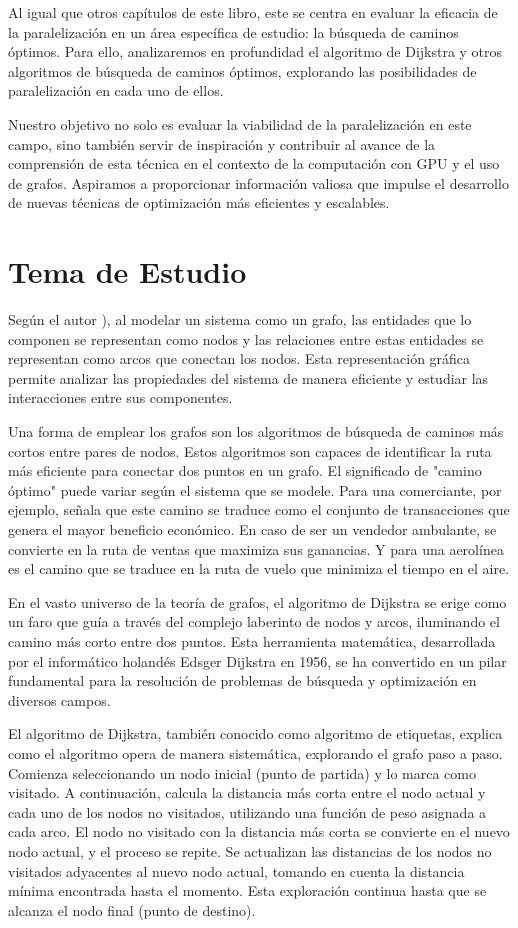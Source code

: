 Al igual que otros capítulos de este libro, este se centra en evaluar la eficacia de la paralelización en un área específica de estudio: la búsqueda de caminos óptimos. Para ello, analizaremos en profundidad el algoritmo de Dijkstra y otros algoritmos de búsqueda de caminos óptimos, explorando las posibilidades de paralelización en cada uno de ellos.

Nuestro objetivo no solo es evaluar la viabilidad de la paralelización en este campo, sino también servir de inspiración y contribuir al avance de la comprensión de esta técnica en el contexto de la computación con GPU y el uso de grafos. Aspiramos a proporcionar información valiosa que impulse el desarrollo de nuevas técnicas de optimización más eficientes y escalables.

\section{Tema de Estudio}

Según el autor \cite{Wilson}), al modelar un sistema como un grafo, las entidades que lo componen se representan como nodos y las relaciones entre estas entidades se representan como arcos que conectan los nodos. Esta representación gráfica permite analizar las propiedades del sistema de manera eficiente y estudiar las interacciones entre sus componentes.

Una forma de emplear los grafos son los algoritmos de búsqueda de caminos más cortos entre pares de nodos. Estos algoritmos son capaces de identificar la ruta más eficiente para conectar dos puntos en un grafo. El significado de "camino óptimo" puede variar según el sistema que se modele. Para una comerciante, por ejemplo, \cite{Minieka} señala que este camino se traduce como el conjunto de transacciones que genera el mayor beneficio económico. En caso de ser un vendedor ambulante, se convierte en la ruta de ventas que maximiza sus ganancias. Y para una aerolínea es el camino que se traduce en la ruta de vuelo que minimiza el tiempo en el aire.

En el vasto universo de la teoría de grafos, el algoritmo de Dijkstra se erige como un faro que guía a través del complejo laberinto de nodos y arcos, iluminando el camino más corto entre dos puntos. Esta herramienta matemática, desarrollada por el informático holandés Edsger Dijkstra en 1956, se ha convertido en un pilar fundamental para la resolución de problemas de búsqueda y optimización en diversos campos.

El algoritmo de Dijkstra, también conocido como algoritmo de etiquetas, \cite{free} explica como el algoritmo opera de manera sistemática, explorando el grafo paso a paso. Comienza seleccionando un nodo inicial (punto de partida) y lo marca como visitado. A continuación, calcula la distancia más corta entre el nodo actual y cada uno de los nodos no visitados, utilizando una función de peso asignada a cada arco.
El nodo no visitado con la distancia más corta se convierte en el nuevo nodo actual, y el proceso se repite. Se actualizan las distancias de los nodos no visitados adyacentes al nuevo nodo actual, tomando en cuenta la distancia mínima encontrada hasta el momento. Esta exploración continua hasta que se alcanza el nodo final (punto de destino).


